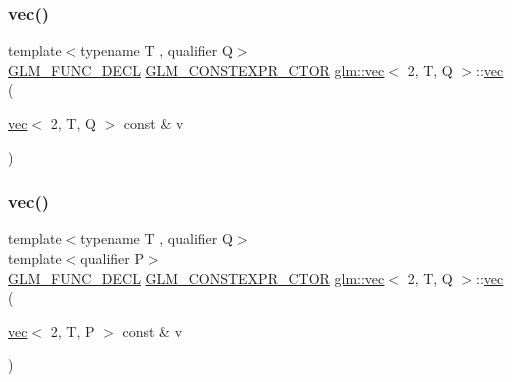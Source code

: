 \subsubsection{\texorpdfstring{vec()}{vec()}\hspace{0.1cm}{\footnotesize\ttfamily [2/17]}}
{\footnotesize\ttfamily template$<$typename T , qualifier Q$>$ \\
\mbox{\hyperlink{setup_8hpp_ab2d052de21a70539923e9bcbf6e83a51}{G\+L\+M\+\_\+\+F\+U\+N\+C\+\_\+\+D\+E\+CL}} \mbox{\hyperlink{setup_8hpp_ad34178a09666081abdb573c14d1f4a5a}{G\+L\+M\+\_\+\+C\+O\+N\+S\+T\+E\+X\+P\+R\+\_\+\+C\+T\+OR}} \mbox{\hyperlink{structglm_1_1vec}{glm\+::vec}}$<$ 2, T, Q $>$\+::\mbox{\hyperlink{structglm_1_1vec}{vec}} (\begin{DoxyParamCaption}\item[{\mbox{\hyperlink{structglm_1_1vec}{vec}}$<$ 2, T, Q $>$ const \&}]{v }\end{DoxyParamCaption})}

\mbox{\label{structglm_1_1vec_3_012_00_01_t_00_01_q_01_4_a7eb23dcef5e913dc1e07d004db53d201}} 
\subsubsection{\texorpdfstring{vec()}{vec()}\hspace{0.1cm}{\footnotesize\ttfamily [3/17]}}
{\footnotesize\ttfamily template$<$typename T , qualifier Q$>$ \\
template$<$qualifier P$>$ \\
\mbox{\hyperlink{setup_8hpp_ab2d052de21a70539923e9bcbf6e83a51}{G\+L\+M\+\_\+\+F\+U\+N\+C\+\_\+\+D\+E\+CL}} \mbox{\hyperlink{setup_8hpp_ad34178a09666081abdb573c14d1f4a5a}{G\+L\+M\+\_\+\+C\+O\+N\+S\+T\+E\+X\+P\+R\+\_\+\+C\+T\+OR}} \mbox{\hyperlink{structglm_1_1vec}{glm\+::vec}}$<$ 2, T, Q $>$\+::\mbox{\hyperlink{structglm_1_1vec}{vec}} (\begin{DoxyParamCaption}\item[{\mbox{\hyperlink{structglm_1_1vec}{vec}}$<$ 2, T, P $>$ const \&}]{v }\end{DoxyParamCaption})}

\mbox{\label{structglm_1_1vec_3_012_00_01_t_00_01_q_01_4_a638fde20902e4e7546f71dfad919a17f}} 
